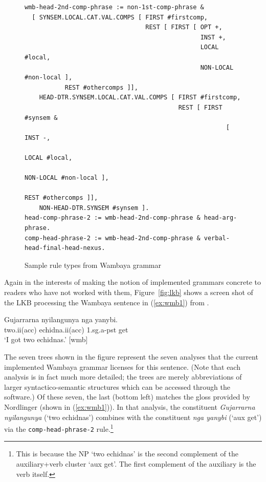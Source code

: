 \documentclass[12pt]{article}
\begin{document}
\begin{figure}
\centering\footnotesize
\begin{verbatim}
wmb-head-2nd-comp-phrase := non-1st-comp-phrase & 
  [ SYNSEM.LOCAL.CAT.VAL.COMPS [ FIRST #firstcomp, 
                                 REST [ FIRST [ OPT +, 
                                                INST +, 
                                                LOCAL #local, 
                                                NON-LOCAL #non-local ], 
           REST #othercomps ]], 
    HEAD-DTR.SYNSEM.LOCAL.CAT.VAL.COMPS [ FIRST #firstcomp, 
                                          REST [ FIRST #synsem & 
                                                       [ INST -, 
                                                         LOCAL #local, 
                                                         NON-LOCAL #non-local ], 
                                                         REST #othercomps ]], 
    NON-HEAD-DTR.SYNSEM #synsem ]. 
head-comp-phrase-2 := wmb-head-2nd-comp-phrase & head-arg-phrase. 
comp-head-phrase-2 := wmb-head-2nd-comp-phrase & verbal-head-final-head-nexus.
\end{verbatim}
\caption{Sample rule types from Wambaya grammar}
\label{fig:hcp}
\end{figure}

Again in the interests of making the notion of implemented grammars
concrete to readers who have not worked with them, Figure~\ref{fig:lkb}
shows a screen shot of the LKB processing the Wambaya sentence
in (\ref{ex:wmb1}) from .

\begin{exe}
\ex\label{ex:wmb1} \gll
Gujarrarna nyilangunya nga yanybi.\\
two.{\sc ii(acc)} echidna.{\sc ii(acc)} 1.{\sc sg.a-pst} get\\
`I got two echidnas.' [wmb]
\end{exe}
%
The seven trees shown in the figure represent the seven analyses that
the current implemented Wambaya grammar licenses for this sentence.
(Note that each analysis is in fact much more detailed; the trees are
merely abbreviations of larger syntactico-semantic structures which
can be accessed through the software.)  Of these seven, the last
(bottom left) matches the gloss provided by Nordlinger (shown in
(\ref{ex:wmb1})).  In that analysis, the constituent {\it Gujarrarna
  nyilangunya} (`two echidnas') combines with the constituent {\it nga
  yanybi} (`{\sc aux} get') via the {\tt comp-head-phrase-2}
rule.\footnote{This is because the NP `two echidnas' is the second
  complement of the auxiliary+verb cluster `{\sc aux} get'.  The first
  complement of the auxiliary is the verb itself.}
\end{document}
